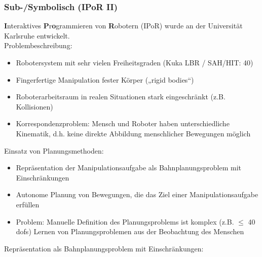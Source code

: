 \subsubsection*{Sub-/Symbolisch (IPoR II)}
\textbf{I}nteraktives \textbf{P}r\textbf{o}grammieren von \textbf{R}obotern (IPoR) wurde an der Universität Karlsruhe entwickelt. \\
Problembeschreibung:
\begin{itemize}
\item Robotersystem mit sehr vielen Freiheitsgraden (Kuka LBR / SAH/HIT: 40)
\item  Fingerfertige Manipulation fester Körper („rigid bodies“)
\item Roboterarbeitsraum in realen Situationen stark eingeschränkt (z.B.
Kollisionen)
\item  \Gu Korrespondenzproblem\Go: Mensch und Roboter haben unterschiedliche
Kinematik, d.h. keine direkte Abbildung menschlicher Bewegungen möglich
\end{itemize}
Einsatz von Planungsmethoden:
\begin{itemize}
\item Repräsentation der Manipulationsaufgabe als Bahnplanungsproblem mit Einschränkungen
\item Autonome Planung von Bewegungen, die das Ziel einer Manipulationsaufgabe erfüllen
\item Problem: Manuelle Definition des Planungsproblems ist komplex (z.B. $\leq$ 40 dofs)
\ita Lernen von Planungsproblemen aus der Beobachtung des Menschen
\end{itemize}
Repräsentation als Bahnplanungsproblem mit Einschränkungen:
